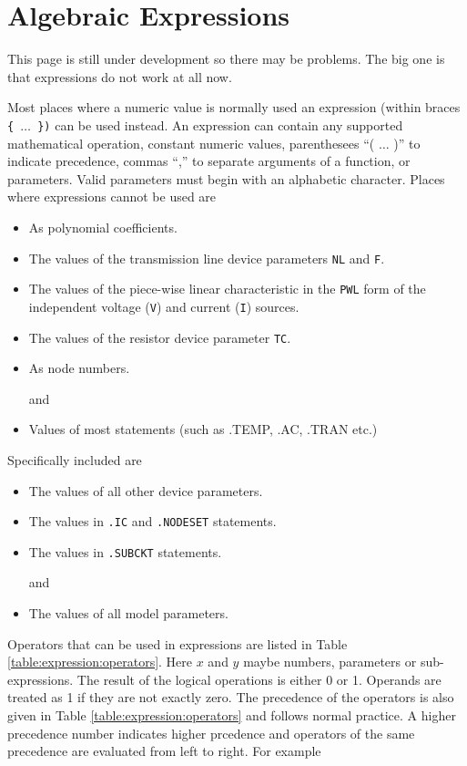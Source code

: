 
\chapter{Algebraic Expressions}
This page is still under development so there may be problems.
The big one is that expressions do not work at all now.

Most places where a numeric value is normally used
an expression (within braces {\tt \{ $\ldots$ \})} can be used instead.
An expression can contain any supported mathematical operation,
constant numeric values, parenthesees ``( $\ldots$ )'' to indicate precedence,
commas ``,'' to separate arguments of a function,
or parameters. Valid parameters must begin with an alphabetic character.
Places where expressions cannot be used are 
     \begin{itemize}
     \item As polynomial coefficients.
     \item The values of the transmission line device parameters {\tt NL} and
           {\tt F}.
     \item The values of the piece-wise linear characteristic in the {\tt PWL}
           form of the independent voltage ({\tt V}) and current ({\tt I})
           sources.
     \item The values of the resistor device parameter {\tt TC}.
     \item As node numbers.
     \item[and]
     \item Values of most statements (such as .TEMP, .AC, .TRAN etc.)
     \end{itemize}
Specifically included are
     \begin{itemize}
     \item The values of all other device parameters.
     \item The values in {\tt .IC} and {\tt .NODESET} statements.
     \item The values in {\tt .SUBCKT} statements.
     \item[and]
     \item The values of all model parameters.
     \end{itemize}

Operators that can be used in expressions are listed in Table
\ref{table:expression:operators}. Here $x$ and $y$ maybe numbers,
parameters or sub-expressions.
The result of the logical operations is either 0 or 1.
Operands are treated as 1 if they are not exactly zero.
The precedence of the operators is also given in Table
\ref{table:expression:operators} and follows normal practice.
A higher precedence number indicates higher prcedence and
operators of the same precedence are evaluated from left to right.
For example\\

